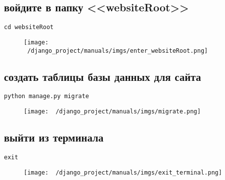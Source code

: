 \documentclass[12pt]{article}
\begin{document}
    \subsection{войдите в папку <<websiteRoot>>}
			\begin{lstlisting}[caption=\phantom{},style=conlst,label={lst:enter_desktop}]
      cd websiteRoot
			\end{lstlisting}
	\begin{figure}[H]
		\centering
		\texttt{[image: ~/django\_project/manuals/imgs/enter\_websiteRoot.png]}
		\caption{}
	\end{figure}
    \subsection{создать таблицы базы данных для сайта}
			\begin{lstlisting}[caption=\phantom{},style=conlst,label={lst:enter_desktop}]
      python manage.py migrate
			\end{lstlisting}
	\begin{figure}[H]
		\centering
		\texttt{[image: ~/django\_project/manuals/imgs/migrate.png]}
		\caption{}
	\end{figure}
    \subsection{ выйти из терминала}
			\begin{lstlisting}[caption=\phantom{},style=conlst,label={lst:enter_desktop}]
      exit
			\end{lstlisting}
	\begin{figure}[H]
		\centering
		\texttt{[image: ~/django\_project/manuals/imgs/exit\_terminal.png]}
		\caption{}
	\end{figure}
\end{document}
